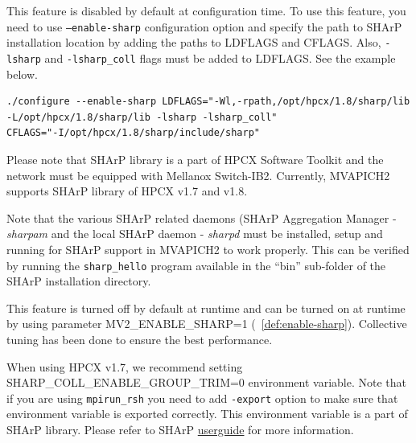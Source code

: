 This feature is disabled by default at configuration time. To use this feature, you need to use
\texttt{--enable-sharp} configuration option and specify the path to SHArP installation
location by adding the paths to LDFLAGS and CFLAGS. Also, \texttt{-lsharp} and
\texttt{-lsharp\_coll} flags must be added to LDFLAGS. See the example below.

\begin{verbatim}
./configure --enable-sharp LDFLAGS="-Wl,-rpath,/opt/hpcx/1.8/sharp/lib
-L/opt/hpcx/1.8/sharp/lib -lsharp -lsharp_coll" 
CFLAGS="-I/opt/hpcx/1.8/sharp/include/sharp" 
\end{verbatim}

Please note that SHArP library is a part of HPCX Software Toolkit and the
network must be equipped with Mellanox Switch-IB2. Currently, MVAPICH2 supports
SHArP library of HPCX v1.7 and v1.8.

Note that the various SHArP related daemons (SHArP Aggregation Manager -
\textit{sharpam} and the local SHArP daemon - \textit{sharpd} must be installed,
setup and running for SHArP support in MVAPICH2 to work properly.  This can be
verified by running the \texttt{sharp\_hello} program available in the ``bin''
sub-folder of the SHArP installation directory.

This feature is turned off by default at runtime and can be turned on at runtime by using parameter
MV2\_ENABLE\_SHARP=1 (~\ref{def:enable-sharp}). Collective tuning has been done
to ensure the best performance. 

When using HPCX v1.7, we recommend setting SHARP\_COLL\_ENABLE\_GROUP\_TRIM=0
environment variable. Note that if you are using \texttt{mpirun\_rsh} you need
to add \texttt{-export} option to make sure that environment variable is
exported correctly.
This environment variable is a part of SHArP library. 
Please refer to SHArP
\href{http://www.mellanox.com/related-docs/prod_acceleration_software/Mellanox_SHARP_SW_Deployment_Guide_v1.7.1.pdf}{userguide} for more information.

